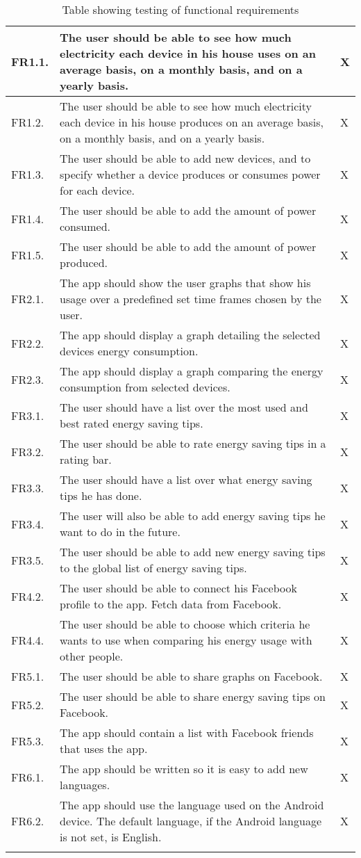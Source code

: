 \begin{longtable}{|l|p{12.5cm}|l|}
\hline
FR1.1. &The user should be able to see how much electricity each device in his house uses on an average basis, on a monthly basis, and on a yearly basis.&X\\\hline
FR1.2. &The user should be able to see how much electricity each device in his house produces on an average basis, on a monthly basis, and on a yearly basis.&X\\\hline
FR1.3. &The user should be able to add new devices, and to specify whether a device produces or consumes power for each device.&X\\\hline
FR1.4. &The user should be able to add the amount of power consumed.&X\\\hline
FR1.5. &The user should be able to add the amount of power produced.&X\\\hline
FR2.1. &The app should show the user graphs that show his usage over a predefined set time frames chosen by the user.&X\\\hline
FR2.2. &The app should display a graph detailing the selected devices energy consumption.&X\\\hline
FR2.3. &The app should display a graph comparing the energy consumption from selected devices.&X\\\hline
FR3.1. &The user should have a list over the most used and best rated energy saving tips.&X\\\hline
FR3.2. &The user should be able to rate energy saving tips in a rating bar.&X\\\hline
FR3.3. &The user should have a list over what energy saving tips he has done.&X\\\hline
FR3.4. &The user will also be able to add energy saving tips he want to do in the future.&X\\\hline
FR3.5. &The user should be able to add new energy saving tips to the global list of energy saving tips.&X\\\hline
FR4.2. &The user should be able to connect his Facebook profile to the app. Fetch data from Facebook.&X\\\hline
FR4.4. &The user should be able to choose which criteria he wants to use when comparing his energy usage with other people.&X\\\hline
FR5.1. &The user should be able to share graphs on Facebook.&X\\\hline
FR5.2. &The user should be able to share energy saving tips on Facebook.&X\\\hline
FR5.3. &The app should contain a list with Facebook friends that uses the app.&X\\\hline
FR6.1. &The app should be written so it is easy to add new languages.&X\\\hline
FR6.2. &The app should use the language used on the Android device. The default language, if the Android language is not set, is English.&X\\\hline
\caption{Table showing testing of functional requirements}
\label{tab:testTable}
\end{longtable} 

